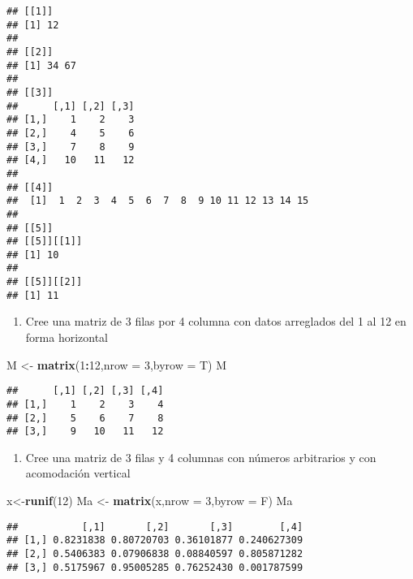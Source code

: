 \documentclass[]{article}
\newenvironment{Shaded}{\begin{snugshade}}{\end{snugshade}}
\newcommand{\KeywordTok}[1]{\textcolor[rgb]{0.13,0.29,0.53}{\textbf{#1}}}
\newcommand{\DataTypeTok}[1]{\textcolor[rgb]{0.13,0.29,0.53}{#1}}
\newcommand{\DecValTok}[1]{\textcolor[rgb]{0.00,0.00,0.81}{#1}}
\newcommand{\StringTok}[1]{\textcolor[rgb]{0.31,0.60,0.02}{#1}}
\newcommand{\OperatorTok}[1]{\textcolor[rgb]{0.81,0.36,0.00}{\textbf{#1}}}
\newcommand{\NormalTok}[1]{#1}
\providecommand{\tightlist}{%
  \setlength{\itemsep}{0pt}\setlength{\parskip}{0pt}}
\begin{document}
\begin{verbatim}
## [[1]]
## [1] 12
## 
## [[2]]
## [1] 34 67
## 
## [[3]]
##      [,1] [,2] [,3]
## [1,]    1    2    3
## [2,]    4    5    6
## [3,]    7    8    9
## [4,]   10   11   12
## 
## [[4]]
##  [1]  1  2  3  4  5  6  7  8  9 10 11 12 13 14 15
## 
## [[5]]
## [[5]][[1]]
## [1] 10
## 
## [[5]][[2]]
## [1] 11
\end{verbatim}

\begin{enumerate}
\def\labelenumi{\alph{enumi}.}
\setcounter{enumi}{3}
\tightlist
\item
  Cree una matriz de 3 filas por 4 columna con datos arreglados del 1 al
  12 en forma horizontal
\end{enumerate}

\begin{Shaded}
\begin{Highlighting}[]
\NormalTok{M <-}\StringTok{ }\KeywordTok{matrix}\NormalTok{(}\DecValTok{1}\OperatorTok{:}\DecValTok{12}\NormalTok{,}\DataTypeTok{nrow =} \DecValTok{3}\NormalTok{,}\DataTypeTok{byrow =}\NormalTok{ T)}
\NormalTok{M}
\end{Highlighting}
\end{Shaded}

\begin{verbatim}
##      [,1] [,2] [,3] [,4]
## [1,]    1    2    3    4
## [2,]    5    6    7    8
## [3,]    9   10   11   12
\end{verbatim}

\begin{enumerate}
\def\labelenumi{\alph{enumi}.}
\setcounter{enumi}{4}
\tightlist
\item
  Cree una matriz de 3 filas y 4 columnas con números arbitrarios y con
  acomodación vertical
\end{enumerate}

\begin{Shaded}
\begin{Highlighting}[]
\NormalTok{x<-}\KeywordTok{runif}\NormalTok{(}\DecValTok{12}\NormalTok{)}
\NormalTok{Ma <-}\StringTok{ }\KeywordTok{matrix}\NormalTok{(x,}\DataTypeTok{nrow =} \DecValTok{3}\NormalTok{,}\DataTypeTok{byrow =}\NormalTok{ F)}
\NormalTok{Ma}
\end{Highlighting}
\end{Shaded}

\begin{verbatim}
##           [,1]       [,2]       [,3]        [,4]
## [1,] 0.8231838 0.80720703 0.36101877 0.240627309
## [2,] 0.5406383 0.07906838 0.08840597 0.805871282
## [3,] 0.5175967 0.95005285 0.76252430 0.001787599
\end{verbatim}
\end{document}
